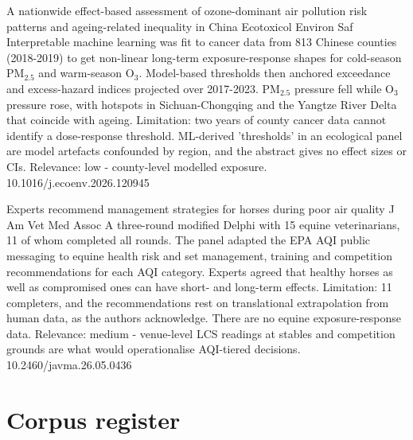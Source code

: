 \documentclass[10pt]{article}
\begin{document}
\par{}\baselineskip{}\baselineskip
{}

{A nationwide effect-based assessment of ozone-dominant air pollution risk patterns and ageing-related inequality in China}
{Ecotoxicol Environ Saf}
{Interpretable machine learning was fit to cancer data from 813 Chinese counties (2018-2019) to get non-linear long-term exposure-response shapes for cold-season PM$_{2.5}$ and warm-season O$_3$. Model-based thresholds then anchored exceedance and excess-hazard indices projected over 2017-2023. PM$_{2.5}$ pressure fell while O$_3$ pressure rose, with hotspots in Sichuan-Chongqing and the Yangtze River Delta that coincide with ageing. Limitation: two years of county cancer data cannot identify a dose-response threshold. ML-derived 'thresholds' in an ecological panel are model artefacts confounded by region, and the abstract gives no effect sizes or CIs. Relevance: low - county-level modelled exposure.}
{10.1016/j.ecoenv.2026.120945}

{Experts recommend management strategies for horses during poor air quality}
{J Am Vet Med Assoc}
{A three-round modified Delphi with 15 equine veterinarians, 11 of whom completed all rounds. The panel adapted the EPA AQI public messaging to equine health risk and set management, training and competition recommendations for each AQI category. Experts agreed that healthy horses as well as compromised ones can have short- and long-term effects. Limitation: 11 completers, and the recommendations rest on translational extrapolation from human data, as the authors acknowledge. There are no equine exposure-response data. Relevance: medium - venue-level LCS readings at stables and competition grounds are what would operationalise AQI-tiered decisions.}
{10.2460/javma.26.05.0436}

\clearpage
\section*{\sffamily\bfseries\color{Deep}Corpus register}
\vspace{-1.5mm}{\color{Amber}\rule{\linewidth}{1.1pt}}\vspace{2.5mm}


\end{document}
